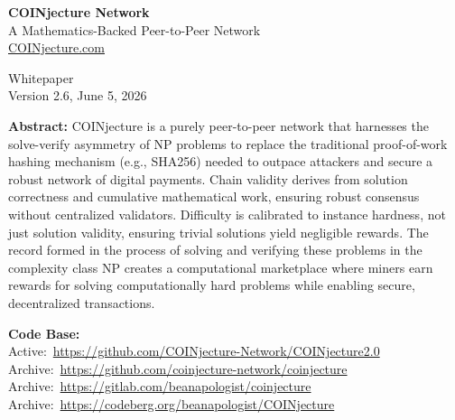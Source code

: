 \documentclass[12pt,letterpaper]{article}
\begin{document}
\begin{titlepage}
  \centering
  \vspace*{2cm}

  {\LARGE\bfseries COINjecture Network}\\[0.4em]
  {\large A Mathematics-Backed Peer-to-Peer Network}\\[0.3em]
  {\normalsize \href{https://COINjecture.com}{COINjecture.com}}

  \vspace{1.5cm}
  {\normalsize Whitepaper\\Version 2.6, June 5, 2026}

  \vspace{2cm}

  \begin{minipage}{0.88\textwidth}
    \small\textbf{Abstract:}
    COINjecture is a purely peer-to-peer network that harnesses the solve-verify asymmetry of NP
    problems to replace the traditional proof-of-work hashing mechanism (e.g., SHA256) needed to
    outpace attackers and secure a robust network of digital payments. Chain validity derives from
    solution correctness and cumulative mathematical work, ensuring robust consensus without
    centralized validators. Difficulty is calibrated to instance hardness, not just solution validity,
    ensuring trivial solutions yield negligible rewards. The record formed in the process of solving
    and verifying these problems in the complexity class NP creates a computational marketplace
    where miners earn rewards for solving computationally hard problems while enabling secure,
    decentralized transactions.
  \end{minipage}

  \vspace{1.5cm}
  \begin{minipage}{0.88\textwidth}
    \small
    \textbf{Code Base:}\\
    Active:~\href{https://github.com/COINjecture-Network/COINjecture2.0}%
      {https://github.com/COINjecture-Network/COINjecture2.0}\\
    Archive:~\href{https://github.com/coinjecture-network/coinjecture}%
      {https://github.com/coinjecture-network/coinjecture}\\
    Archive:~\href{https://gitlab.com/beanapologist/coinjecture}%
      {https://gitlab.com/beanapologist/coinjecture}\\
    Archive:~\href{https://codeberg.org/beanapologist/COINjecture}%
      {https://codeberg.org/beanapologist/COINjecture}
  \end{minipage}

  \vfill
\end{titlepage}
\end{document}
